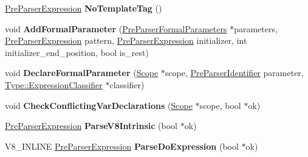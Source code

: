 \begin{DoxyCompactItemize}
\item 
\hyperlink{classv8_1_1internal_1_1_pre_parser_expression}{Pre\+Parser\+Expression} {\bfseries No\+Template\+Tag} ()\hypertarget{classv8_1_1internal_1_1_pre_parser_traits_a6d35505b4aaded43a56be32d5bb45314}{}\label{classv8_1_1internal_1_1_pre_parser_traits_a6d35505b4aaded43a56be32d5bb45314}

\item 
void {\bfseries Add\+Formal\+Parameter} (\hyperlink{structv8_1_1internal_1_1_pre_parser_formal_parameters}{Pre\+Parser\+Formal\+Parameters} $\ast$parameters, \hyperlink{classv8_1_1internal_1_1_pre_parser_expression}{Pre\+Parser\+Expression} pattern, \hyperlink{classv8_1_1internal_1_1_pre_parser_expression}{Pre\+Parser\+Expression} initializer, int initializer\+\_\+end\+\_\+position, bool is\+\_\+rest)\hypertarget{classv8_1_1internal_1_1_pre_parser_traits_a5b562b21c30c1c4dad1f89ad14ff672e}{}\label{classv8_1_1internal_1_1_pre_parser_traits_a5b562b21c30c1c4dad1f89ad14ff672e}

\item 
void {\bfseries Declare\+Formal\+Parameter} (\hyperlink{classv8_1_1internal_1_1_scope}{Scope} $\ast$scope, \hyperlink{classv8_1_1internal_1_1_pre_parser_identifier}{Pre\+Parser\+Identifier} parameter, \hyperlink{classv8_1_1internal_1_1_expression_classifier}{Type\+::\+Expression\+Classifier} $\ast$classifier)\hypertarget{classv8_1_1internal_1_1_pre_parser_traits_aaf2ae6cd542175bdc40c756403b1f840}{}\label{classv8_1_1internal_1_1_pre_parser_traits_aaf2ae6cd542175bdc40c756403b1f840}

\item 
void {\bfseries Check\+Conflicting\+Var\+Declarations} (\hyperlink{classv8_1_1internal_1_1_scope}{Scope} $\ast$scope, bool $\ast$ok)\hypertarget{classv8_1_1internal_1_1_pre_parser_traits_afe9289130f843f276aa679b73d41c8eb}{}\label{classv8_1_1internal_1_1_pre_parser_traits_afe9289130f843f276aa679b73d41c8eb}

\item 
\hyperlink{classv8_1_1internal_1_1_pre_parser_expression}{Pre\+Parser\+Expression} {\bfseries Parse\+V8\+Intrinsic} (bool $\ast$ok)\hypertarget{classv8_1_1internal_1_1_pre_parser_traits_a4b3b4c0d65204fb58b0278768733d4e9}{}\label{classv8_1_1internal_1_1_pre_parser_traits_a4b3b4c0d65204fb58b0278768733d4e9}

\item 
V8\+\_\+\+I\+N\+L\+I\+NE \hyperlink{classv8_1_1internal_1_1_pre_parser_expression}{Pre\+Parser\+Expression} {\bfseries Parse\+Do\+Expression} (bool $\ast$ok)\hypertarget{classv8_1_1internal_1_1_pre_parser_traits_a282ac413838b5dd8c1a0027983e74c51}{}\label{classv8_1_1internal_1_1_pre_parser_traits_a282ac413838b5dd8c1a0027983e74c51}


\end{DoxyCompactItemize}
